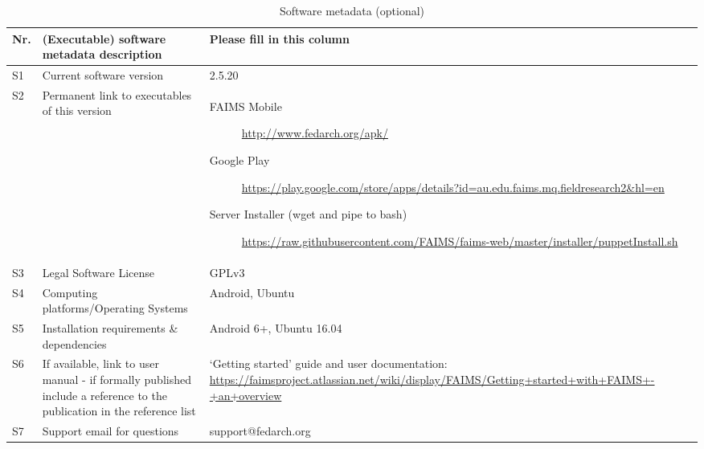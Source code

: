 \documentclass[preprint,12pt, a4paper]{elsarticle}
\begin{document}
\begin{table}[!h]
\begin{tabular}{|l|p{6.5cm}|p{6.5cm}|}
\hline
\textbf{Nr.} & \textbf{(Executable) software metadata description} & \textbf{Please fill in this column} \\
\hline
S1 & Current software version & 2.5.20 \\
\hline
S2 & Permanent link to executables of this version  & \begin{description} \item [FAIMS Mobile]\url{http://www.fedarch.org/apk/}
\item [Google Play] \url{https://play.google.com/store/apps/details?id=au.edu.faims.mq.fieldresearch2&hl=en}
\item [Server Installer (wget and pipe to bash)] \url{https://raw.githubusercontent.com/FAIMS/faims-web/master/installer/puppetInstall.sh} \end{description}\\

\hline
S3 & Legal Software License & GPLv3 \\
\hline
S4 & Computing platforms/Operating Systems & Android, Ubuntu \\
\hline
S5 & Installation requirements \& dependencies & Android 6+, Ubuntu 16.04 \\
\hline
S6 & If available, link to user manual - if formally published include a reference to the publication in the reference list & `Getting started' guide and user documentation:
\url{https://faimsproject.atlassian.net/wiki/display/FAIMS/Getting+started+with+FAIMS+-+an+overview} \\
\hline
S7 & Support email for questions & support@fedarch.org\\
\hline
\end{tabular}
\caption{Software metadata (optional)}
\label{} 
\end{table}
\end{document}
